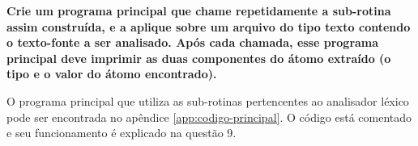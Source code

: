 
\textbf{Crie um programa principal que chame repetidamente a sub-rotina assim construída, e a aplique sobre um arquivo do tipo texto contendo o texto-fonte a ser analisado. Após cada chamada, esse programa principal deve imprimir as duas componentes do átomo extraído (o tipo e o valor do átomo encontrado).}

O programa principal que utiliza as sub-rotinas pertencentes ao analisador léxico pode ser encontrada no apêndice \ref{app:codigo-principal}. O código está comentado e seu funcionamento é explicado na questão 9.
